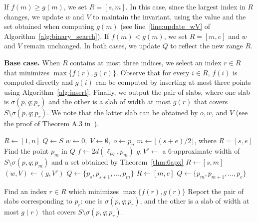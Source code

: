 If $f(m) \ge g(m)$, we set $R = [s, m]$.
In this case, since the largest index in $R$ changes, we update $w$ and $V$ to maintain the invariant, using the value and the set obtained when computing $g(m)$ (see line~\ref{line:update_wV} of Algorithm~\ref{alg:binary_search}).
If $f(m) < g(m)$, we set $R = [m, e]$ and $w$ and $V$ remain unchanged.
In both cases, we update $Q$ to reflect the new range $R$.

\textbf{Base case.} When $R$ contains at most three indices, we select an index $r \in R$ that minimizes $\max \{ f(r), g(r) \}$.
Observe that for every $i\in R$, $f(i)$ is computed directly and $g(i)$ can be computed by inserting at most three points using Algorithm~\ref{alg:insert}. 
Finally, we output the pair of slabs, where one slab is $\sigma(p, q; p_r)$ and the other is a slab of width at most $g(r)$ that covers $S \setminus \sigma(p, q; p_r)$. 
We note that the latter slab can be obtained by $o, w$, and $V$ (see the proof of Theorem A.3 in~\cite{chan2006faster}).



\begin{algorithm}
\caption{A linear-time $10$-approximation algorithm}
\label{alg:binary_search}
\begin{algorithmic}[1]
\State $R \gets [1, n]$
\State $Q \gets S$
\State $w \gets 0, \; V \gets \emptyset, \; o \gets p_n$ 
    \State $m\gets \lfloor (s + e)/2 \rfloor$, where $R = [s, e]$
    \State Find the point $p_{m}$ in $Q$
    \State $f \gets 2d(\ell_{pq}, p_{m})$ \label{line:f}
    \State $g, V' \gets $ a $6$-approximate width of $S\setminus \sigma(p,q;p_{m})$ and a set obtained by Theorem~\ref{thm:6apx}\label{line:g}
     \label{line:bs_condition}
        \State $R \gets [s, m]$ \label{line:if_R}
        \State $(w, V)\gets (g, V')$ \label{line:update_wV}
        \State $Q \gets \{p_{s}, p_{s +1}, \ldots, p_{m} \}$ \label{line:if_Q}
    \Else
        \State $R \gets [m, e]$ \label{line:else_R}
        \State $Q \gets \{p_{m}, p_{m +1}, \ldots, p_{e} \}$ \label{line:else_Q}
        
    \EndIf
\EndWhile

\State Find an index $r\in R$ which minimizes $\max\{f(r), g(r)\}$\label{line:final_index} \label{line:final_R}
\State Report the pair of slabs corresponding to $p_r$: one is $\sigma(p, q; p_r)$, and the other is a slab of width at most $g(r)$ that covers $S \setminus \sigma(p, q; p_r)$.

\end{algorithmic}
\end{algorithm}





